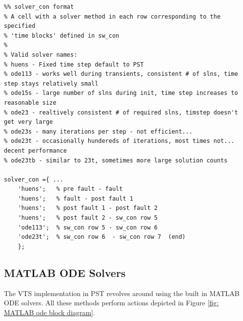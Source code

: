 \begin{lstlisting}[caption={Solver Control Array Example},label={lst: solverCon ex}]
\end{lstlisting}\vspace{-2 em}
\begin{verbatim}
%% solver_con format
% A cell with a solver method in each row corresponding to the specified
% 'time blocks' defined in sw_con
%
% Valid solver names:
% huens - Fixed time step default to PST
% ode113 - works well during transients, consistent # of slns, time step stays relatively small
% ode15s - large number of slns during init, time step increases to reasonable size
% ode23 - realtively consistent # of required slns, timstep doesn't get very large
% ode23s - many iterations per step - not efficient...
% ode23t - occasionally hundereds of iterations, most times not... decent performance
% ode23tb - similar to 23t, sometimes more large solution counts

solver_con ={ ...
    'huens';   % pre fault - fault
    'huens';   % fault - post fault 1
    'huens';   % post fault 1 - post fault 2
    'huens';   % post fault 2 - sw_con row 5
    'ode113';  % sw_con row 5 - sw_con row 6 
    'ode23t';  % sw_con row 6  - sw_con row 7  (end)
    };
\end{verbatim}

\pagebreak
\subsection{MATLAB ODE Solvers}
The VTS implementation in PST revolves around using the built in MATLAB ODE solvers.
All these methods perform actions depicted in Figure \ref{fig: MATLAB ode block diagram}.

